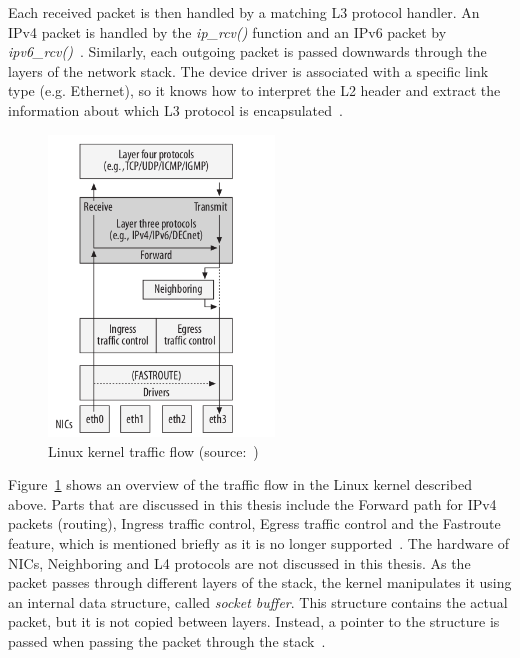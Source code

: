 Each received packet is then handled by a matching L3 protocol handler.
An IPv4 packet is handled by the {\it{ip\_rcv()}} function
and an IPv6 packet by {\it{ipv6\_rcv()}}~\cite{linux-kernel-networking}.
Similarly, each outgoing packet is passed downwards through the layers of the network stack.
The device driver is associated with a specific link type (e.g. Ethernet),
so it knows how to interpret the L2 header
and extract the information about which L3 protocol is encapsulated~\cite{understanding-internals}.

\begin{figure}[H]
	\bigskip
	\centering
	\includegraphics[width=6cm,keepaspectratio]{fig/flow.png}
	\caption{Linux kernel traffic flow (source:~\cite{linux-kernel-networking})}
	\label{fig:linux-flow}
	\bigskip
\end{figure}

Figure~\ref{fig:linux-flow} shows an overview of the traffic flow in the Linux kernel described above.
Parts that are discussed in this thesis include the Forward path for IPv4 packets (routing),
Ingress traffic control, Egress traffic control and the Fastroute feature, which is mentioned briefly
as it is no longer supported~\cite{linux-kernel-networking}.
The hardware of NICs, Neighboring and L4 protocols are not discussed in this thesis.
As the packet passes through different layers of the stack,
the kernel manipulates it using an internal data structure, called {\it{socket buffer}}.
This structure contains the actual packet, but it is not copied between layers.
Instead, a pointer to the structure is passed when passing the packet through the stack~\cite{understanding-internals}.












